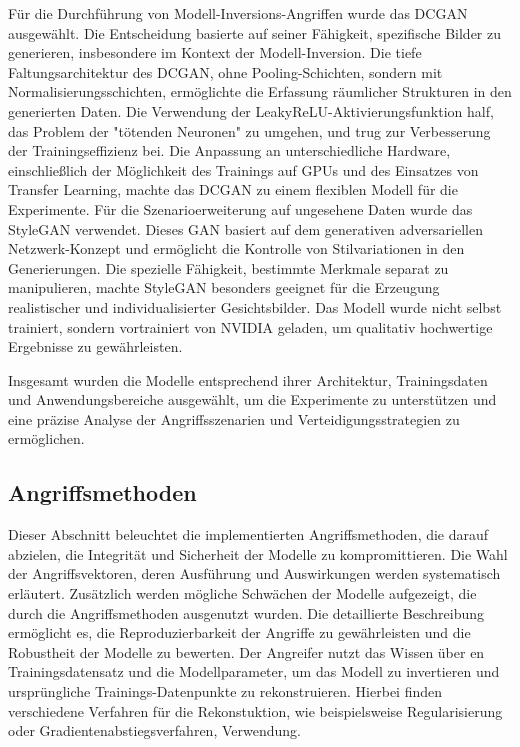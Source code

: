 Für die Durchführung von Modell-Inversions-Angriffen wurde das DCGAN ausgewählt. Die Entscheidung basierte auf seiner Fähigkeit, spezifische Bilder zu generieren, insbesondere im Kontext der Modell-Inversion. Die tiefe Faltungsarchitektur des DCGAN, ohne Pooling-Schichten, sondern mit Normalisierungsschichten, ermöglichte die Erfassung räumlicher Strukturen in den generierten Daten. Die Verwendung der LeakyReLU-Aktivierungsfunktion half, das Problem der "tötenden Neuronen" zu umgehen, und trug zur Verbesserung der Trainingseffizienz bei. Die Anpassung an unterschiedliche Hardware, einschließlich der Möglichkeit des Trainings auf GPUs und des Einsatzes von Transfer Learning, machte das DCGAN zu einem flexiblen Modell für die Experimente. Für die Szenarioerweiterung auf ungesehene Daten wurde das StyleGAN verwendet. Dieses GAN basiert auf dem generativen adversariellen Netzwerk-Konzept und ermöglicht die Kontrolle von Stilvariationen in den Generierungen. Die spezielle Fähigkeit, bestimmte Merkmale separat zu manipulieren, machte StyleGAN besonders geeignet für die Erzeugung realistischer und individualisierter Gesichtsbilder. Das Modell wurde nicht selbst trainiert, sondern vortrainiert von NVIDIA geladen, um qualitativ hochwertige Ergebnisse zu gewährleisten.

Insgesamt wurden die Modelle entsprechend ihrer Architektur, Trainingsdaten und Anwendungsbereiche ausgewählt, um die Experimente zu unterstützen und eine präzise Analyse der Angriffsszenarien und Verteidigungsstrategien zu ermöglichen.
\subsection{Angriffsmethoden}
Dieser Abschnitt beleuchtet die implementierten Angriffsmethoden, die darauf abzielen, die Integrität und Sicherheit der Modelle zu kompromittieren. Die Wahl der Angriffsvektoren, deren Ausführung und Auswirkungen werden systematisch erläutert. Zusätzlich werden mögliche Schwächen der Modelle aufgezeigt, die durch die Angriffsmethoden ausgenutzt wurden. Die detaillierte Beschreibung ermöglicht es, die Reproduzierbarkeit der Angriffe zu gewährleisten und die Robustheit der Modelle zu bewerten. Der Angreifer nutzt das Wissen über en Trainingsdatensatz und die Modellparameter, um das Modell zu invertieren und ursprüngliche Trainings-Datenpunkte zu rekonstruieren. Hierbei finden verschiedene Verfahren für die Rekonstuktion, wie beispielsweise Regularisierung oder Gradientenabstiegsverfahren, Verwendung.

